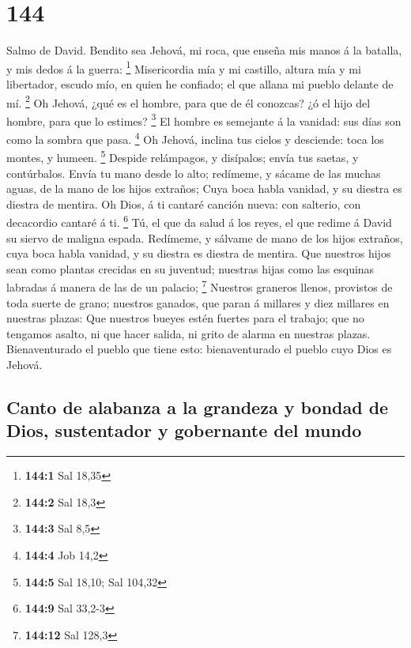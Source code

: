 \hypertarget{section-143}{%
\section{144}\label{section-143}}

 Salmo de David. Bendito sea Jehová, mi roca, que enseña mis
manos á la batalla, y mis dedos á la guerra: \footnote{\textbf{144:1}
  Sal 18,35}  Misericordia mía y mi castillo, altura mía y
mi libertador, escudo mío, en quien he confiado; el que allana mi pueblo
delante de mí. \footnote{\textbf{144:2} Sal 18,3}  Oh
Jehová, ¿qué es el hombre, para que de él conozcas? ¿ó el hijo del
hombre, para que lo estimes? \footnote{\textbf{144:3} Sal 8,5}
 El hombre es semejante á la vanidad: sus días son como la
sombra que pasa. \footnote{\textbf{144:4} Job 14,2}  Oh
Jehová, inclina tus cielos y desciende: toca los montes, y humeen.
\footnote{\textbf{144:5} Sal 18,10; Sal 104,32}  Despide
relámpagos, y disípalos; envía tus saetas, y contúrbalos. 
Envía tu mano desde lo alto; redímeme, y sácame de las muchas aguas, de
la mano de los hijos extraños;  Cuya boca habla vanidad, y
su diestra es diestra de mentira.  Oh Dios, á ti cantaré
canción nueva: con salterio, con decacordio cantaré á ti. \footnote{\textbf{144:9}
  Sal 33,2-3}  Tú, el que da salud á los reyes, el que
redime á David su siervo de maligna espada.  Redímeme, y
sálvame de mano de los hijos extraños, cuya boca habla vanidad, y su
diestra es diestra de mentira.  Que nuestros hijos sean
como plantas crecidas en su juventud; nuestras hijas como las esquinas
labradas á manera de las de un palacio; \footnote{\textbf{144:12} Sal
  128,3}  Nuestros graneros llenos, provistos de toda
suerte de grano; nuestros ganados, que paran á millares y diez millares
en nuestras plazas:  Que nuestros bueyes estén fuertes para
el trabajo; que no tengamos asalto, ni que hacer salida, ni grito de
alarma en nuestras plazas.  Bienaventurado el pueblo que
tiene esto: bienaventurado el pueblo cuyo Dios es Jehová.

\hypertarget{canto-de-alabanza-a-la-grandeza-y-bondad-de-dios-sustentador-y-gobernante-del-mundo}{%
\subsection{Canto de alabanza a la grandeza y bondad de Dios,
sustentador y gobernante del
mundo}\label{canto-de-alabanza-a-la-grandeza-y-bondad-de-dios-sustentador-y-gobernante-del-mundo}}

